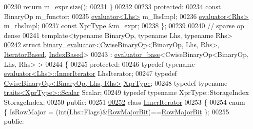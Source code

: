 \begin{DoxyCode}
00230     \textcolor{keywordflow}{return} m\_expr.size();
00231   \}
00232 
00233 \textcolor{keyword}{protected}:
00234   \textcolor{keyword}{const} BinaryOp m\_functor;
00235   \hyperlink{struct_eigen_1_1internal_1_1evaluator}{evaluator<Lhs>} m\_lhsImpl;
00236   \hyperlink{struct_eigen_1_1internal_1_1evaluator}{evaluator<Rhs>} m\_rhsImpl;
00237   \textcolor{keyword}{const} XprType &m\_expr;
00238 \};
00239 
00240 \textcolor{comment}{// sparse op dense}
00241 \textcolor{keyword}{template}<\textcolor{keyword}{typename} BinaryOp, \textcolor{keyword}{typename} Lhs, \textcolor{keyword}{typename} Rhs>
\hyperlink{struct_eigen_1_1internal_1_1binary__evaluator_3_01_cwise_binary_op_3_01_binary_op_00_01_lhs_00_0cb5b32f8780f5e04222972f8f6ae2d90}{00242} \textcolor{keyword}{struct }\hyperlink{struct_eigen_1_1internal_1_1binary__evaluator}{binary\_evaluator}<\hyperlink{group___core___module_class_eigen_1_1_cwise_binary_op}{CwiseBinaryOp}<BinaryOp, Lhs, Rhs>, 
      \hyperlink{struct_eigen_1_1internal_1_1_iterator_based}{IteratorBased}, \hyperlink{struct_eigen_1_1internal_1_1_index_based}{IndexBased}>
00243   : \hyperlink{struct_eigen_1_1internal_1_1evaluator__base}{evaluator\_base}<CwiseBinaryOp<BinaryOp, Lhs, Rhs> >
00244 \{
00245 \textcolor{keyword}{protected}:
00246   \textcolor{keyword}{typedef} \textcolor{keyword}{typename} \hyperlink{struct_eigen_1_1internal_1_1evaluator}{evaluator<Lhs>::InnerIterator}  LhsIterator;
00247   \textcolor{keyword}{typedef} \hyperlink{group___core___module_class_eigen_1_1_cwise_binary_op}{CwiseBinaryOp<BinaryOp, Lhs, Rhs>} 
      \hyperlink{group___core___module_class_eigen_1_1_cwise_binary_op}{XprType};
00248   \textcolor{keyword}{typedef} \textcolor{keyword}{typename} \hyperlink{struct_eigen_1_1internal_1_1traits}{traits<XprType>::Scalar} Scalar;
00249   \textcolor{keyword}{typedef} \textcolor{keyword}{typename} XprType::StorageIndex StorageIndex;
00250 \textcolor{keyword}{public}:
00251 
\hyperlink{class_eigen_1_1internal_1_1binary__evaluator_3_01_cwise_binary_op_3_01_binary_op_00_01_lhs_00_012b4683c8809d5a8c88ca2030de640ed2}{00252}   \textcolor{keyword}{class }\hyperlink{class_eigen_1_1_inner_iterator}{InnerIterator}
00253   \{
00254     \textcolor{keyword}{enum} \{ IsRowMajor = (int(Lhs::Flags)&\hyperlink{group__flags_gae4f56c2a60bbe4bd2e44c5b19cbe8762}{RowMajorBit})==\hyperlink{group__flags_gae4f56c2a60bbe4bd2e44c5b19cbe8762}{RowMajorBit} \};
00255   \textcolor{keyword}{public}:

\end{DoxyCode}
